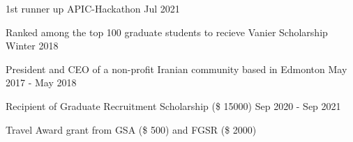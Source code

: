  1st runner up APIC-Hackathon	\hfill Jul 2021
 
Ranked among the top 100 graduate students to recieve Vanier Scholarship	\hfill Winter 2018

President and CEO of a non-profit Iranian community based in Edmonton \hfill May 2017 - May 2018

Recipient of Graduate Recruitment Scholarship (\$ 15000) \hfill Sep 2020 - Sep 2021

Travel Award grant from GSA (\$ 500) and FGSR (\$ 2000)